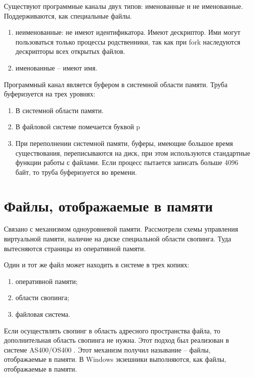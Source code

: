 Существуют программные каналы двух типов: именованные и не именованные. Поддерживаются, как специальные файлы.

\begin{enumerate}
    \item неименованные: не имеют идентификатора. Имеют дескриптор. Ими могут пользоваться только процессы родственники, так как при fork наследуются дескрипторы всех открытых файлов.
    \item именованные – имеют имя.
\end{enumerate} 

Программный канал является буфером в системной области памяти. Труба буферизуется на трех уровнях:
\begin{enumerate}
    \item В системной области памяти.
    \item В файловой системе помечается буквой p
    \item При переполнении системной памяти, буферы, имеющие большое время существования, переписываются на диск, при этом используются стандартные функции работы с файлами. Если процесс пытается записать больше 4096 байт, то труба буферизуется во времени.
\end{enumerate} 


\section{Файлы, отображаемые в памяти}

Связано с механизмом одноуровневой памяти. Рассмотрели схемы управления виртуальной памяти, наличие на диске специальной области свопинга. Туда вытесняются страницы из оперативной памяти. 

Один и тот же файл может находить в системе в трех копиях:
\begin{enumerate}
    \item оперативной памяти;
	\item области свопинга;
	\item файловая система.
\end{enumerate} 

Если осуществлять свопинг в область адресного пространства файла, то дополнительная область свопинга не нужна. Этот подход был реализован в системе AS400/OS400 \cite{Soltis_AS400}. Этот механизм получил называние – файлы, отображаемые в памяти. В Windows экзешники выполняются, как файлы, отображаемые в памяти.